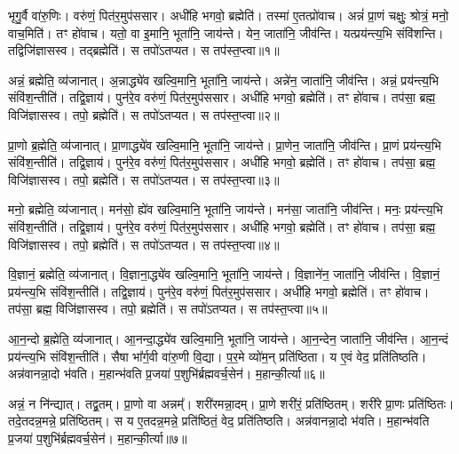 भृगु॒र्वै वा॑रु॒णिः। 
वरु॑णं॒ पित॑र॒मुप॑ससार। 
अधी॑हि भगवो॒ ब्रह्मेति॑। 
तस्मा॑ ए॒तत्प्रो॑वाच। 
अन्नं॑ प्रा॒णं चक्षुः॒ श्रोत्रं॒ मनो॒ वाच॒मिति॑। 
तꣳ हो॑वाच। 
यतो॒ वा इ॒मानि॒ भूता॑नि॒ जाय॑न्ते। 
येन॒ जाता॑नि॒ जीव॑न्ति। 
यत्प्रय॑न्त्य॒भि संवि॑शन्ति। 
तद्विजि॑ज्ञासस्व। 
तद्ब्रह्मेति॑। 
स तपो॑ऽतप्यत। 
स तप॑स्त॒प्त्वा॥१॥

अन्नं॒ ब्रह्मेति॒ व्य॑जानात्। 
अ॒न्नाद्ध्ये॑व खल्वि॒मानि॒ भूता॑नि॒ जाय॑न्ते। 
अन्ने॑न॒ जाता॑नि॒ जीव॑न्ति। 
अन्नं॒ प्रय॑न्त्य॒भि संवि॑श॒न्तीति॑। 
तद्वि॒ज्ञाय॑। 
पुन॑रे॒व वरु॑णं॒ पित॑र॒मुप॑ससार। 
अधी॑हि भगवो॒ ब्रह्मेति॑। 
तꣳ हो॑वाच। 
तप॑सा॒ ब्रह्म॒ विजि॑ज्ञासस्व। 
तपो॒ ब्रह्मेति॑। 
स तपो॑ऽतप्यत। 
स तप॑स्त॒प्त्वा॥२॥

प्रा॒णो ब्र॒ह्मेति॒ व्य॑जानात्। 
प्रा॒णाद्ध्ये॑व खल्वि॒मानि॒ भूता॑नि॒ जाय॑न्ते। 
प्रा॒णेन॒ जाता॑नि॒ जीव॑न्ति। 
प्रा॒णं प्रय॑न्त्य॒भि संवि॑श॒न्तीति॑। 
तद्वि॒ज्ञाय॑। 
पुन॑रे॒व वरु॑णं॒ पित॑र॒मुप॑ससार। 
अधी॑हि भगवो॒ ब्रह्मेति॑। 
तꣳ हो॑वाच। 
तप॑सा॒ ब्रह्म॒ विजि॑ज्ञासस्व। 
तपो॒ ब्रह्मेति॑। 
स तपो॑ऽतप्यत। 
स तप॑स्त॒प्त्वा॥३॥

मनो॒ ब्रह्मेति॒ व्य॑जानात्। 
मन॑सो॒ ह्ये॑व खल्वि॒मानि॒ भूता॑नि॒ जाय॑न्ते। 
मन॑सा॒ जाता॑नि॒ जीव॑न्ति। 
मनः॒ प्रय॑न्त्य॒भि संवि॑श॒न्तीति॑। 
तद्वि॒ज्ञाय॑। 
पुन॑रे॒व वरु॑णं॒ पित॑र॒मुप॑ससार। 
अधी॑हि भगवो॒ ब्रह्मेति॑। 
तꣳ हो॑वाच। 
तप॑सा॒ ब्रह्म॒ विजि॑ज्ञासस्व। 
तपो॒ ब्रह्मेति॑। 
स तपो॑ऽतप्यत। 
स तप॑स्त॒प्त्वा॥४॥

वि॒ज्ञानं॒ ब्रह्मेति॒ व्य॑जानात्। 
वि॒ज्ञाना॒द्ध्ये॑व खल्वि॒मानि॒ भूता॑नि॒ जाय॑न्ते। 
वि॒ज्ञाने॑न॒ जाता॑नि॒ जीव॑न्ति। 
वि॒ज्ञानं॒ प्रय॑न्त्य॒भि संवि॑श॒न्तीति॑। 
तद्वि॒ज्ञाय॑। 
पुन॑रे॒व वरु॑णं॒ पित॑र॒मुप॑ससार। 
अधी॑हि भगवो॒ ब्रह्मेति॑। 
तꣳ हो॑वाच। 
तप॑सा॒ ब्रह्म॒ विजि॑ज्ञासस्व। 
तपो॒ ब्रह्मेति॑। 
स तपो॑ऽतप्यत। 
स तप॑स्त॒प्त्वा॥५॥

आ॒न॒न्दो ब्र॒ह्मेति॒ व्य॑जानात्। 
आ॒नन्दा॒द्ध्ये॑व खल्वि॒मानि॒ भूता॑नि॒ जाय॑न्ते। 
आ॒न॒न्देन॒ जाता॑नि॒ जीव॑न्ति। 
आ॒न॒न्दं प्रय॑न्त्य॒भि संवि॑श॒न्तीति॑। 
सैषा भा᳚र्ग॒वी वा॑रु॒णी वि॒द्या। 
प॒र॒मे व्यो॑म॒न् प्रति॑\-ष्ठिता। 
य ए॒वं वेद॒ प्रति॑\-तिष्ठति। 
अन्न॑वानन्ना॒दो भ॑वति। 
म॒हान्भ॑वति प्र॒जया॑ प॒शुभि॑र्ब्रह्मवर्च॒सेन॑। 
म॒हान्की॒र्त्या॥६॥

अन्नं॒ न नि॑न्द्यात्। 
तद्व्र॒तम्। 
प्रा॒णो वा अन्नम्᳚। 
शरी॑रमन्ना॒दम्। 
प्रा॒णे शरी॑रं॒ प्रति॑\-ष्ठितम्। 
शरी॑रे प्रा॒णः प्रति॑\-ष्ठितः। 
तदे॒तदन्न॒मन्ने॒ प्रति॑\-ष्ठितम्। 
स य ए॒तदन्न॒मन्ने॒ प्रति॑\-ष्ठितं॒ वेद॒ प्रति॑\-तिष्ठति। 
अन्न॑वानन्ना॒दो भ॑वति। 
म॒हान्भ॑वति प्र॒जया॑ प॒शुभि॑र्ब्रह्मवर्च॒सेन॑। 
म॒हान्की॒र्त्या॥७॥


